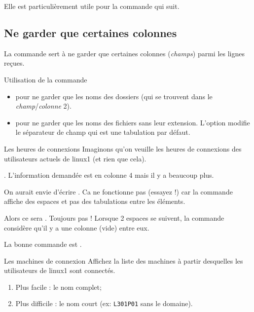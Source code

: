 \documentclass[a4paper,11pt]{style-esi/td}
\begin{document}
		Elle est particulièrement utile pour la commande qui suit.

	\subsection{Ne garder que certaines colonnes}
	
		La commande  sert à ne garder que certaines colonnes 
		(\emph{champs})
		parmi les lignes reçues.

		\begin{Exemple}{Utilisation de la commande }
			\begin{itemize}
			\item 
				pour ne garder que les noms des dossiers 
				(qui se trouvent dans le \emph{champ}/\emph{colonne} 2).
			\item 
				pour ne garder que les noms des fichiers sans leur extension.
				L'option  modifie le séparateur de champ
				qui est une tabulation par défaut.
			\end{itemize}
		\end{Exemple}

		\begin{Experience}{Les heures de connexions}
			Imaginons qu'on veuille les heures 
			de connexions des utilisateurs actuels de linux1
			(et rien que cela).
			\begin{steps}
			\item 
				. 
				L'information demandée est en colonne 4 mais il y a beaucoup plus.
			\item 
				On aurait envie d'écrire .
				Ca ne fonctionne pas (essayez !)
				car la commande affiche des espaces
				et pas des tabulations entre les éléments.
			\item 
				Alors ce sera .
				Toujours pas !
				Lorsque 2 espaces se suivent,
				la commande considère qu'il y a une colonne (vide) entre eux.
			\item 
				La bonne commande est .
			\end{steps}
		\end{Experience}

		\begin{Exercice}{Les machines de connexion}
			Affichez la liste des machines à partir desquelles les utilisateurs
			de linux1 sont connectés.
			\begin{enumerate}[label=\alph*)]
				\item Plus facile : le nom complet;
				\item Plus difficile : le nom court 
					(ex: \verb_L301P01_ sans le domaine).
			\end{enumerate} 
		\end{Exercice}
\end{document}
